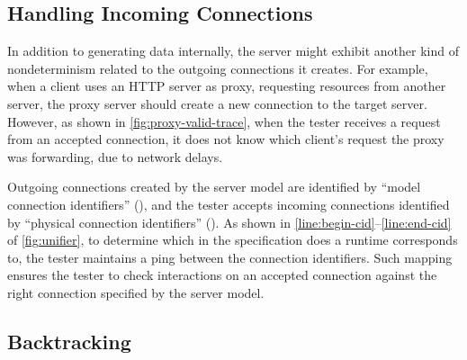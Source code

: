 \subsection{Handling Incoming Connections}
In addition to generating data internally, the server might exhibit another kind
of nondeterminism related to the outgoing connections it creates.  For example,
when a client uses an HTTP server as proxy, requesting resources from another
server, the proxy server should create a new connection to the target server.
However, as shown in \autoref{fig:proxy-valid-trace}, when the tester receives a
request from an accepted connection, it does not know which client's
request the proxy was forwarding, due to network delays.

Outgoing connections created by the server model are identified by ``model
connection identifiers'' (), and the tester accepts incoming
connections identified by ``physical connection identifiers'' ().  As
shown in \autoref{line:begin-cid}--\ref{line:end-cid} of
\autoref{fig:unifier}, to determine which  in the specification does a
runtime  corresponds to, the tester maintains a ping between
the connection identifiers.  Such mapping ensures the tester to check
interactions on an accepted connection against the right connection specified by
the server model.


\subsection{Backtracking}


